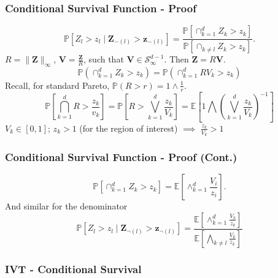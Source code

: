 \documentclass[aspectratio=169,10pt,notes]{beamer}
\begin{document}
\begin{frame}
  \frametitle{Conditional Survival Function - Proof}
  {\small
  \begin{equation*}
    \label{eqn:condsurv1d}
    \mathbb{P}\left[Z_l > z_l\mid \bm{Z}_{-(l)} > \bm{z}_{-(l)}\right] =
      \frac{\mathbb{P}\left[\cap_{k = 1}^d Z_k > z_k\right]}{\mathbb{P}\left[\cap_{k \neq l} Z_k > z_k\right]}.
  \end{equation*}
  $R = \lVert\bm{Z}\rVert_{\infty}$, $\bm{V} = \frac{\bm{Z}}{R}$, such that
    $\bm{V}\in \mathcal{S}_{\infty}^{d-1}$.  Then $\bm{Z} = R\bm{V}$.
  \begin{equation*}
    \mathbb{P}\left(\cap_{k = 1}^d Z_k > z_k\right) = \mathbb{P}\left(\cap_{k = 1}^d RV_k > z_k\right)
  \end{equation*}
  Recall, for standard Pareto, $\mathbb{P}(R > r) = 1\wedge\frac{1}{r}$.
  \begin{equation*}
    \mathbb{P}\left[\bigcap_{k = 1}^d R > \frac{z_k}{v_k}\right] =
      \mathbb{P}\left[R  > \bigvee_{k=1}^d\frac{z_k}{V_k}\right] =
      \mathbb{E}\left[1 \bigwedge \left(\bigvee_{k = 1}^d\frac{z_k}{V_k}\right)^{-1}\right]
  \end{equation*}
  $V_k \in [0,1]$; $z_k > 1$ (for the region of interest) $\implies$ $\frac{z_k}{V_k} > 1$
  }
\end{frame}

\begin{frame}
    \frametitle{Conditional Survival Function - Proof (Cont.)}
    {\small 
  \begin{equation*}
    \mathbb{P}\left[\cap_{k = 1}^d Z_k > z_k\right] = \mathbb{E}\left[\wedge_{k = 1}^d\frac{V_i}{z_i}\right].
  \end{equation*}
  And similar for the denominator
  \begin{equation*}
    \mathbb{P}\left[Z_l > z_l\mid \bm{Z}_{\neg(l)} > \bm{z}_{\neg(l)}\right] =
      \frac{\mathbb{E}\left[\wedge_{k = 1}^d \frac{V_k}{z_k}\right]}{\mathbb{E}\left[
                \bigwedge_{k \neq l}\frac{V_k}{z_k}\right]}
  \end{equation*}
  }
\end{frame}

\subsubsection{IVT - Conditional Survival}
\end{document}
